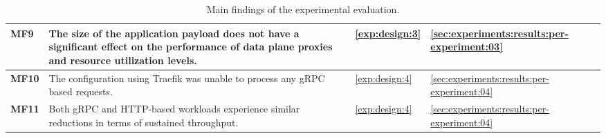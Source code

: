 \begin{table}[t]
\begin{tabularx}{\linewidth}{@{}lXll@{}}
\textbf{MF9} &
The size of the application payload does not have a significant effect on the performance of data plane proxies and resource utilization levels. &
\ref{exp:design:3} &
\cref{sec:experiments:results:per-experiment:03} \\
\midrule  
  
\textbf{MF10} &
The configuration using Traefik was unable to process any gRPC based requests. &
\ref{exp:design:4} &
\cref{sec:experiments:results:per-experiment:04} \\
\midrule  
  
\textbf{MF11} &
Both gRPC and HTTP-based workloads experience similar reductions in terms of sustained throughput. &
\ref{exp:design:4} &
\cref{sec:experiments:results:per-experiment:04} \\ 
  
\bottomrule
\end{tabularx}

\caption[Main findings of the experimental evaluation]{Main findings of the experimental evaluation.}
\label{tab:experiment:main-fidings}
\end{table}